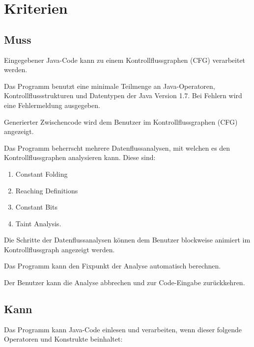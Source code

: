 
\section{Kriterien}

\subsection{Muss}

Eingegebener Java-Code kann zu einem Kontrollflussgraphen (CFG) verarbeitet werden.

Das Programm benutzt eine minimale Teilmenge an Java-Operatoren, Kontrollflussstrukturen und Datentypen der Java Version 1.7. Bei Fehlern wird eine Fehlermeldung ausgegeben.

Generierter Zwischencode wird dem Benutzer im Kontrollflussgraphen (CFG) angezeigt.

Das Programm beherrscht mehrere Datenflussanalysen, mit welchen es den Kontrollflussgraphen analysieren kann.
Diese sind:\par
\begin{enumerate}[label=(\alph*)]
\item Constant Folding
\item Reaching Definitions
\item Constant Bits
\item Taint Analysis.
\end{enumerate}

Die Schritte der Datenflussanalysen können dem Benutzer blockweise animiert im Kontrollflussgraph angezeigt werden.

Das Programm kann den Fixpunkt der Analyse automatisch berechnen.

Der Benutzer kann die Analyse abbrechen und zur Code-Eingabe zurückkehren.

\subsection{Kann}

Das Programm kann Java-Code einlesen und verarbeiten, wenn dieser folgende Operatoren und Konstrukte beinhaltet:

